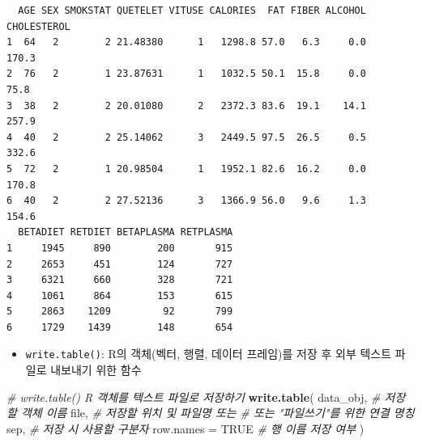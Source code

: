 \documentclass[
  11pt,
]{krantz}
\newenvironment{Shaded}{\begin{snugshade}}{\end{snugshade}}
\newcommand{\CharTok}[1]{\textcolor[rgb]{0.5,0.5,0.5}{#1}}
\newcommand{\CommentTok}[1]{\textcolor[rgb]{0.37,0.37,0.37}{\textit{#1}}}
\newcommand{\DataTypeTok}[1]{\textcolor[rgb]{0.27,0.27,0.27}{#1}}
\newcommand{\KeywordTok}[1]{\textcolor[rgb]{0.27,0.27,0.27}{\textbf{#1}}}
\newcommand{\NormalTok}[1]{#1}
\newcommand{\OperatorTok}[1]{\textcolor[rgb]{0.43,0.43,0.43}{\textbf{#1}}}
\newcommand{\OtherTok}[1]{\textcolor[rgb]{0.37,0.37,0.37}{#1}}
\newcommand{\StringTok}[1]{\textcolor[rgb]{0.5,0.5,0.5}{#1}}
\providecommand{\tightlist}{%
  \setlength{\itemsep}{0pt}\setlength{\parskip}{0pt}}
\begin{document}
\begin{Shaded}
\end{Shaded}

\begin{verbatim}
  AGE SEX SMOKSTAT QUETELET VITUSE CALORIES  FAT FIBER ALCOHOL CHOLESTEROL
1  64   2        2 21.48380      1   1298.8 57.0   6.3     0.0       170.3
2  76   2        1 23.87631      1   1032.5 50.1  15.8     0.0        75.8
3  38   2        2 20.01080      2   2372.3 83.6  19.1    14.1       257.9
4  40   2        2 25.14062      3   2449.5 97.5  26.5     0.5       332.6
5  72   2        1 20.98504      1   1952.1 82.6  16.2     0.0       170.8
6  40   2        2 27.52136      3   1366.9 56.0   9.6     1.3       154.6
  BETADIET RETDIET BETAPLASMA RETPLASMA
1     1945     890        200       915
2     2653     451        124       727
3     6321     660        328       721
4     1061     864        153       615
5     2863    1209         92       799
6     1729    1439        148       654
\end{verbatim}

\normalsize

\begin{itemize}
\tightlist
\item
  \texttt{write.table()}: R의 객체(벡터, 행렬, 데이터 프레임)를 저장 후 외부 텍스트 파일로 내보내기 위한 함수
\end{itemize}

\footnotesize

\begin{Shaded}
\begin{Highlighting}[]
\CommentTok{# write.table() R 객체를 텍스트 파일로 저장하기}
\KeywordTok{write.table}\NormalTok{(}
\NormalTok{  data_obj, }\CommentTok{# 저장할 객체 이름}
\NormalTok{  file,  }\CommentTok{# 저장할 위치 및 파일명  또는 }
         \CommentTok{# 또는 "파일쓰기"를 위한 연결 명칭}
\NormalTok{  sep,   }\CommentTok{# 저장 시 사용할 구분자}
  \DataTypeTok{row.names =} \OtherTok{TRUE} \CommentTok{# 행 이름 저장 여부}
\NormalTok{)}
\end{Highlighting}
\end{Shaded}
\end{document}
